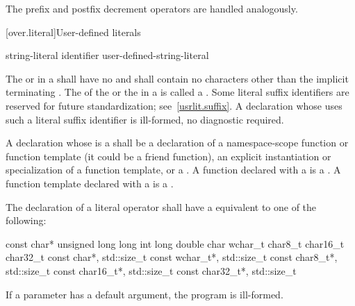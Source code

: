 \pnum
The prefix and postfix decrement operators
\tcode{-{-}}
are handled analogously.

[over.literal]{User-defined literals}%
%

\begin{bnf}
\br
     string-literal identifier\br
     user-defined-string-literal
\end{bnf}

\pnum
The  or 
in a  shall have no
 and shall contain no characters other than the
implicit terminating .
The  of the  or
the  in a  is called a
.
Some literal suffix identifiers are reserved for future standardization;
see~\ref{usrlit.suffix}.  A declaration whose  uses
such a literal suffix identifier is ill-formed, no diagnostic required.

\pnum
A declaration whose  is a
 shall be a declaration of a namespace-scope
function or function template (it could be a friend
function), an explicit instantiation or specialization of a
function template, or a .
A function declared with a  is a . A function template declared with a 
is a .

\pnum
The declaration of a literal operator shall have a
 equivalent to one of the following:

\begin{codeblock}
const char*
unsigned long long int
long double
char
wchar_t
char8_t
char16_t
char32_t
const char*, std::size_t
const wchar_t*, std::size_t
const char8_t*, std::size_t
const char16_t*, std::size_t
const char32_t*, std::size_t
\end{codeblock}

If a parameter has a default argument, the program is
ill-formed.

